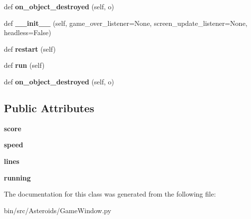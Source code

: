 \begin{DoxyCompactItemize}
\item 
def {\bfseries on\+\_\+object\+\_\+destroyed} (self, o)\hypertarget{classGameWindow_1_1GameWindow_abf3b77ea8ac501d676eb86846da66835}{}\label{classGameWindow_1_1GameWindow_abf3b77ea8ac501d676eb86846da66835}

\item 
def {\bfseries \+\_\+\+\_\+init\+\_\+\+\_\+} (self, game\+\_\+over\+\_\+listener=None, screen\+\_\+update\+\_\+listener=None, headless=False)\hypertarget{classGameWindow_1_1GameWindow_a02010cc4371544b655369e6fd5794d71}{}\label{classGameWindow_1_1GameWindow_a02010cc4371544b655369e6fd5794d71}

\item 
def {\bfseries restart} (self)\hypertarget{classGameWindow_1_1GameWindow_a39325b3e2eb66949d2dd15e495fa6642}{}\label{classGameWindow_1_1GameWindow_a39325b3e2eb66949d2dd15e495fa6642}

\item 
def {\bfseries run} (self)\hypertarget{classGameWindow_1_1GameWindow_a87dc06fb2818940a4cf0d6318719e048}{}\label{classGameWindow_1_1GameWindow_a87dc06fb2818940a4cf0d6318719e048}

\item 
def {\bfseries on\+\_\+object\+\_\+destroyed} (self, o)\hypertarget{classGameWindow_1_1GameWindow_abf3b77ea8ac501d676eb86846da66835}{}\label{classGameWindow_1_1GameWindow_abf3b77ea8ac501d676eb86846da66835}

\end{DoxyCompactItemize}
\subsection*{Public Attributes}
\begin{DoxyCompactItemize}
\item 
{\bfseries score}\hypertarget{classGameWindow_1_1GameWindow_a1d84d147b6e32a9b135ebd2c25fa9de2}{}\label{classGameWindow_1_1GameWindow_a1d84d147b6e32a9b135ebd2c25fa9de2}

\item 
{\bfseries speed}\hypertarget{classGameWindow_1_1GameWindow_a65e5c68dfa1017d7d36c127dc91f7800}{}\label{classGameWindow_1_1GameWindow_a65e5c68dfa1017d7d36c127dc91f7800}

\item 
{\bfseries lines}\hypertarget{classGameWindow_1_1GameWindow_a5596975989f8091d3e6424c80eff1559}{}\label{classGameWindow_1_1GameWindow_a5596975989f8091d3e6424c80eff1559}

\item 
{\bfseries running}\hypertarget{classGameWindow_1_1GameWindow_a75c82f26a471a2bce7c30cc1ce450e85}{}\label{classGameWindow_1_1GameWindow_a75c82f26a471a2bce7c30cc1ce450e85}

\end{DoxyCompactItemize}


The documentation for this class was generated from the following file\+:\begin{DoxyCompactItemize}
\item 
bin/src/\+Asteroids/Game\+Window.\+py\end{DoxyCompactItemize}
